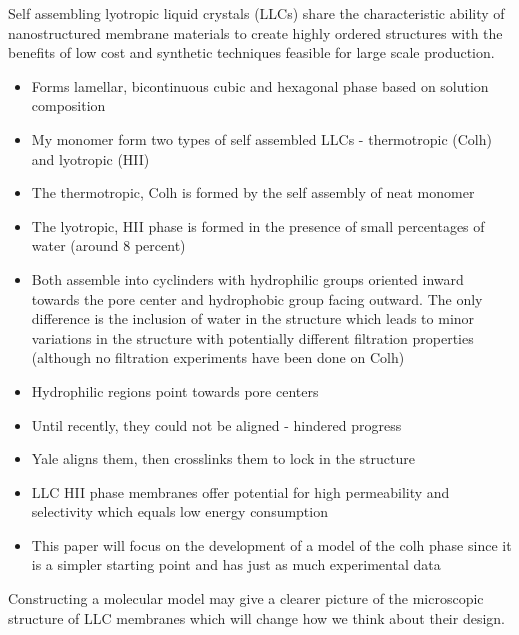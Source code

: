 \documentclass{article}
\begin{document}
	Self assembling lyotropic liquid crystals (LLCs) share the characteristic ability of nanostructured membrane materials to create highly ordered structures with the benefits of low cost and synthetic techniques feasible for large scale production.
	\begin{itemize}
		\item Forms lamellar, bicontinuous cubic and hexagonal phase based on solution composition
		\item My monomer form two types of self assembled LLCs - thermotropic (Colh) and lyotropic (HII) 
		\item The thermotropic, Colh is formed by the self assembly of neat monomer
		\item The lyotropic, HII phase is formed in the presence of small percentages of water (around 8 percent)
		\item Both assemble into cyclinders with hydrophilic groups oriented inward towards the pore center and hydrophobic group facing outward. The only difference is the inclusion of water in the structure which leads to minor variations in the structure with potentially different filtration properties (although no filtration experiments have been done on Colh)  
		\item Hydrophilic regions point towards pore centers
		\item Until recently, they could not be aligned - hindered progress
		\item Yale aligns them, then crosslinks them to lock in the structure
		\item LLC HII phase membranes offer potential for high permeability and selectivity which equals low energy consumption
		\item This paper will focus on the development of a model of the colh phase since it is a simpler starting point and has just as much experimental data
	\end{itemize}
	Constructing a molecular model may give a clearer picture of the microscopic structure of LLC membranes which will change how we think about their design.
\end{document}
